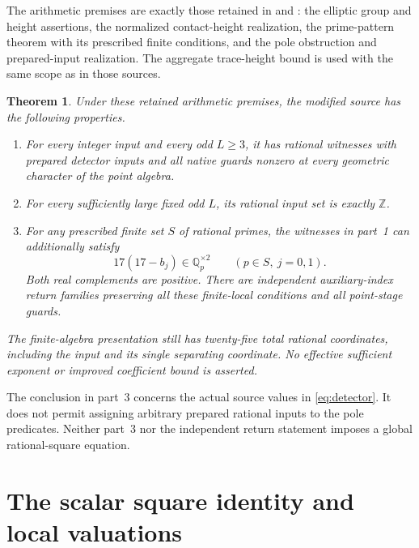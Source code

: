\documentclass[11pt,a4paper]{article}
\newtheorem{theorem}{Theorem}[section]
\newcommand{\Q}{\mathbb Q}\newcommand{\Z}{\mathbb Z}
\begin{document}
The arithmetic premises are exactly those retained in
\cite[Section 1]{General} and \cite[Section 1]{UnitNorm}: the elliptic
group and height assertions, the normalized contact-height realization,
the prime-pattern theorem with its prescribed finite conditions, and the
pole obstruction and prepared-input realization. The aggregate
trace-height bound is used with the same scope as in those sources.

\begin{samepage}
\begin{theorem}\label{thm:main}
Under these retained arithmetic premises, the modified source has the
following properties.
\begin{enumerate}
\item For every integer input and every odd $L\ge3$, it has rational
      witnesses with prepared detector inputs and all native guards
      nonzero at every geometric character of the point algebra.
\item For every sufficiently large fixed odd $L$, its rational input
      set is exactly $\Z$.
\item For any prescribed finite set $S$ of rational primes, the witnesses
      in part~1 can additionally satisfy
      \[
      17(17-b_j)\in\Q_p^{\times2}\qquad(p\in S,\ j=0,1).
      \]
      Both real complements are positive. There are independent
      auxiliary-index return families preserving all these finite-local
      conditions and all point-stage guards.
\end{enumerate}
The finite-algebra presentation still has twenty-five total rational
coordinates, including the input and its single separating coordinate.
No effective sufficient exponent or improved coefficient bound is asserted.
\end{theorem}
\end{samepage}

The conclusion in part~3 concerns the actual source values in
\eqref{eq:detector}. It does not permit assigning arbitrary prepared
rational inputs to the pole predicates. Neither part~3 nor the independent
return statement imposes a global rational-square equation.

\section{The scalar square identity and local valuations}
\end{document}
